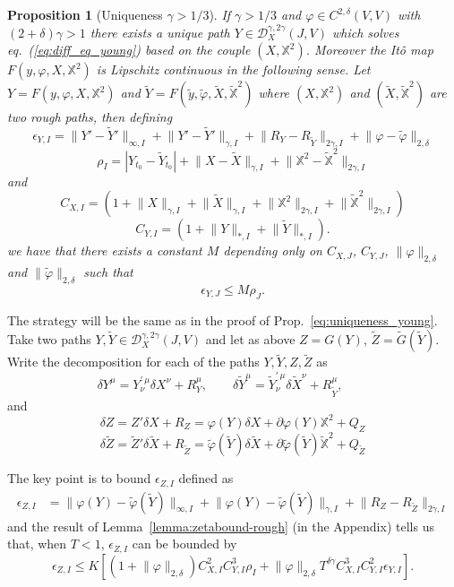 \documentclass[a4paper,12pt,reqno]{amsproc}
\newcommand{\der}{\delta\!}
\newcommand{\DD}{\mathcal{D}}
\newcommand{\norm}[1]{\lVert #1\rVert}
\newcommand{\wt}{\widetilde}
\newtheorem{proposition}{Proposition}
\begin{document}
\begin{proposition}[Uniqueness $\gamma > 1/3$]
   If $\gamma > 1/3$ and $\varphi \in C^{2,\delta}(V,V)$ with $(2+\delta)\gamma>1$
there exists a unique path $Y \in
\DD^{\gamma,2\gamma}_X(J,V)$ which solves eq.~(\ref{eq:diff_eq_young})
based on the couple $(X,\mathbb{X}^2)$. Moreover the It\^o map
$F(y,\varphi,X,\mathbb{X}^2)$ is Lipschitz continuous in the following
sense. Let $Y = F(y,\varphi,X,\mathbb{X}^2)$ and $\wt Y = F(\wt y, \wt
\varphi, \wt X, \mathbb{\wt X}^2)$ where  $(X,\mathbb{X}^2)$ and $(\wt
X, \mathbb{\wt X}^2)$ are two rough paths, then defining 
\begin{equation*}
  \epsilon_{Y,I} = \norm{Y'-\wt Y'}_{\infty,I} +  \norm{Y'-\wt
  Y'}_{\gamma,I} + \norm{R_Y-R_{\wt Y}}_{2\gamma,I} + \norm{\varphi-\wt\varphi}_{2,\delta}
\end{equation*}
\begin{equation*}
  \rho_I = |Y_{t_0} - \wt Y_{t_0}| + \norm{X-\wt X}_{\gamma,I} +
  \norm{\mathbb{X}^2-\mathbb{\wt X}^2}_{2\gamma,I}
\end{equation*}
and
$$
C_{X,I} = (1+\norm{X}_{\gamma,I}+\norm{\widetilde
  X}_{\gamma,I}+\norm{\mathbb{X}^2}_{2\gamma,I}+\norm{\mathbb{\wt X}^2}_{2\gamma,I})
$$
$$
C_{Y,I} = (1+\norm{Y}_{*,I}+\norm{\widetilde Y}_{*,I}).
$$
we have that there exists a constant $M$ depending only on $C_{X,J}$,
$C_{Y,J}$, $\norm{\varphi}_{2,\delta}$ and $\norm{\wt \varphi}_{2,\delta}$ such that
$$
\epsilon_{Y,J} \le M \rho_{J}.
$$
\end{proposition}

\proof
The strategy will be the same as in the proof of
Prop.~\ref{eq:uniqueness_young}.
Take two paths $Y,\widetilde Y \in \DD_X^{\gamma,2\gamma}(J,V)$ and
let as above 
$Z = G(Y)$, $\wt Z = \wt G (\wt Y)$. Write
the decomposition for each of the paths $Y, \wt Y, Z,\wt Z$ as
$$
\der Y^\mu = Y^{\prime\,\mu}_{\nu} \der X^\nu + R^\mu_Y, \qquad 
\der \widetilde Y^\mu = \widetilde Y^{\prime\,\mu}_{\nu} \der \widetilde X^\nu + R^\mu_{\widetilde Y}, \qquad 
$$
and
$$
\der Z = Z' \der X + R_Z = \varphi(Y) \der X + \partial \varphi(Y) \mathbb{X}^2 + Q_Z
$$
$$
\der \wt Z = \wt Z' \der \wt X + R_{\wt Z} = \wt \varphi(\wt Y) \der
\wt X + \partial \wt \varphi(\wt Y)
\mathbb{\wt X}^2 + Q_{\wt Z}
$$


The key point is to bound $\epsilon_{Z,I}$ defined as
\begin{equation*}
  \begin{split}
\epsilon_{Z,I} & = \norm{\varphi(Y)-\wt \varphi(\wt Y)}_{\infty,I} +
\norm{\varphi(Y)-\wt \varphi(\wt Y)}_{\gamma,I} + \norm{R_Z-R_{\wt
    Z}}_{2\gamma,I}    
  \end{split}
\end{equation*}
and the result of Lemma~\ref{lemma:zetabound-rough} (in the Appendix) tells us that, when
$T < 1$, $\epsilon_{Z,I}$ can be bounded by
\begin{equation}
\label{eq:zetabound}
   \epsilon_{Z,I} \le K  [(1+\norm{\varphi}_{2,\delta})C_{X,I}^2 C_{Y,I}^3
   \rho_I + \norm{\varphi}_{2,\delta} T^{\delta\gamma} C_{X,I}^3 C_{Y,I}^2 \epsilon_{Y,I}].
 \end{equation}
\end{document}
